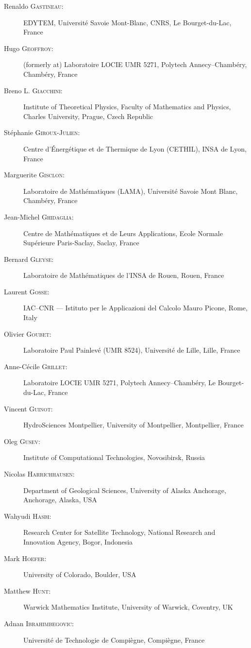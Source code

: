 \documentclass[final, a4paper, oneside, 12pt]{article}
\numberwithin{equation}{section}
\begin{document}
\begin{description}
  \item[Renaldo \textsc{Gastineau}:] EDYTEM, Universit\'e Savoie Mont-Blanc, CNRS, Le Bourget-du-Lac, France
  \item[Hugo \textsc{Geoffroy}:] (formerly at) Laboratoire LOCIE UMR 5271, Polytech Annecy--Chamb\'ery, Chamb\'ery, France
  \item[Breno L. \textsc{Giacchini}:] Institute of Theoretical Physics, Faculty of Mathematics and Physics, Charles University, Prague, Czech Republic
  \item[St\'ephanie \textsc{Giroux-Julien}:] Centre d'\'Energ\'etique et de Thermique de Lyon (CETHIL), INSA de Lyon, France
  \item[Marguerite \textsc{Gisclon}:] Laboratoire de Math\'ematiques (LAMA), Universit\'e Savoie Mont Blanc, Chamb\'ery, France
  \item[Jean-Michel \textsc{Ghidaglia}:] Centre de Math\'ematiques et de Leurs Applications, Ecole Normale Sup\'erieure Paris-Saclay, Saclay, France
  \item[Bernard \textsc{Gleyse}:] Laboratoire de Math\'ematiques de l'INSA de Rouen, Rouen, France
  \item[Laurent \textsc{Gosse}:] IAC--CNR --- Istituto per le Applicazioni del Calcolo Mauro Picone, Rome, Italy
  \item[Olivier \textsc{Goubet}:] Laboratoire Paul Painlev\'e (UMR 8524), Universit\'e de Lille, Lille, France
  \item[Anne-C\'ecile \textsc{Grillet}:] Laboratoire LOCIE UMR 5271, Polytech Annecy--Chamb\'ery, Le Bourget-du-Lac, France
  \item[Vincent \textsc{Guinot}:] HydroSciences Montpellier, University of Montpellier, Montpellier, France
  \item[Oleg \textsc{Gusev}:] Institute of Computational Technologies, Novosibirsk, Russia
  \item[Nicolas \textsc{Harrichhausen}:] Department of Geological Sciences, University of Alaska Anchorage, Anchorage, Alaska, USA
  \item[Wahyudi \textsc{Hasbi}:] Research Center for Satellite Technology, National Research and Innovation Agency, Bogor, Indonesia
  \item[Mark \textsc{Hoefer}:] University of Colorado, Boulder, USA
  \item[Matthew \textsc{Hunt}:] Warwick Mathematics Institute, University of Warwick, Coventry, UK
  \item[Adnan \textsc{Ibrahimbegovic}:] Universit\'e de Technologie de Compi\`egne, Compi\`egne, France

\end{description}
\end{document}
